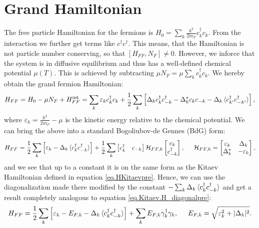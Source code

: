 \section{Grand Hamiltonian} \label{sec.HFFfull}
The free particle Hamiltonian for the fermions is $H_0 = \sum_k \frac{k^2}{2m_F} c^\dagger_k c_k$. From the interaction we further get terms like $c^\dagger c^\dagger$. This means, that the Hamiltonian is not particle number conserving, so that $[H_{FF}, N_F] \neq 0$. However, we inforce that the system is in diffusive equilibrium and thus has a well-defined chemical potential $\mu(T)$. This is achieved by subtracting $\mu N_F = \mu \sum_k c^\dagger_k c_k$. We hereby obtain the grand fermion Hamiltonian:
\begin{equation}
H_{FF} = H_0-\mu N_F + H^\text{int}_{FF} = \sum_k \varepsilon_k c^\dagger_k c_k + \frac{1}{2}\sum_{k} \left[ \Delta_k c^\dagger_k c^\dagger_{-k} - \Delta^*_k c_k c_{-k} - \Delta_k \braket {c^\dagger_{k'}c^\dagger_{-k'}} \right], 
\label{eq.HFFdef}
\end{equation} 
where $\varepsilon_k = \frac{k^2}{2m_F}-\mu$ is the kinetic energy relative to the chemical potential. We can bring the above into a standard Bogoliubov-de Gennes (BdG) form:
\begin{equation}
H_{FF} = \frac{1}{2}\sum_k \left[\varepsilon_k - \Delta_k \braket {c^\dagger_k c^\dagger_{-k}}\right] + \frac{1}{2}\sum_{k} \begin{bmatrix} c_k^\dagger & c_{-k} \end{bmatrix} \mathcal{H}_{FF,k} \begin{bmatrix} c_k \\ c^\dagger_{-k} \end{bmatrix}, \hspace{0.5cm} \mathcal{H}_{FF,k} = \begin{bmatrix} \varepsilon_k & \Delta_k \\ \Delta^*_k & -\varepsilon_k \end{bmatrix}, 
\end{equation}
and we see that up to a constant it is on the same form as the Kitaev Hamiltonian defined in equation \eqref{eq.HKitaevpre}. Hence, we can use the diagonalization made there modified by the constant $-\sum_k \Delta_k\braket {c^\dagger_k c^\dagger_{-k}} $ and get a result completely analogous to equation \eqref{eq.Kitaev.H_diagonalpre}: 
\begin{equation}
H_{FF} = \frac{1}{2}\sum_k \left[\varepsilon_k-E_{F,k}-\Delta_k\braket {c^\dagger_k c^\dagger_{-k}}\right] + \sum_k E_{F,k} \gamma^\dagger_k \gamma_k, \hspace{0.5cm} E_{F,k} = \sqrt{\varepsilon_k^2 + |\Delta_k|^2}.
\label{eq.Kitaev.HFF_diagonal}
\end{equation}
